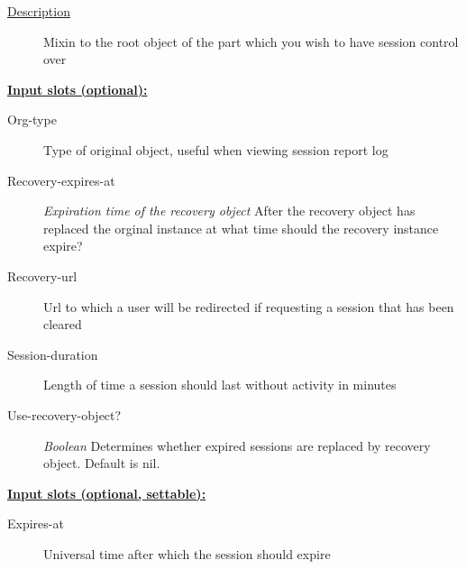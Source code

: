 \documentclass [11pt]{book}
\begin{document}
\begin{itemize}
\begin{description}
\item [
\underline{Description}]


Mixin to the root object of the part which you wish to have session control over



\end{description}








\textbf{
\underline{Input slots (optional):}}

\begin{description}

\item [Org-type]
Type of original object, useful when viewing session report log


\item [Recovery-expires-at]
\emph{Expiration time of the recovery object} After the recovery object has replaced the orginal
instance at what time should the recovery instance expire?


\item [Recovery-url]
Url to which a user will be redirected if requesting a session that has been cleared


\item [Session-duration]
Length of time a session should last without activity in minutes


\item [Use-recovery-object?]
\emph{Boolean} Determines whether expired sessions are replaced by recovery object. Default is nil.


\end{description}






\textbf{
\underline{Input slots (optional, settable):}}

\begin{description}

\item [Expires-at]
Universal time after which the session should expire


\end{description}







\end{itemize}
\end{document}
